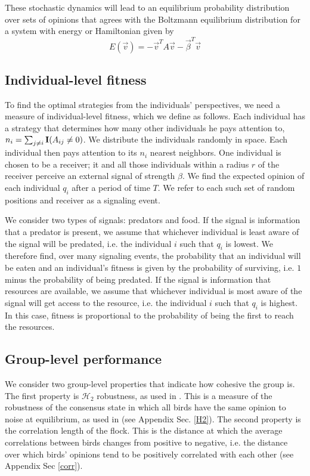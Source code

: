 \documentclass{article}
\begin{document}
These stochastic dynamics will lead to an equilibrium probability distribution over sets of opinions that agrees with the Boltzmann equilibrium distribution for a system with energy or Hamiltonian given by 
\begin{equation*}
E(\vec{v})=-\vec{v}^TA\vec{v}-\vec{\beta}^T\vec{v}
\end{equation*}  

\subsection{Individual-level fitness }
To find the optimal strategies from the individuals' perspectives, we need a measure of individual-level fitness, which we define as follows. Each individual has a strategy that determines how many other individuals he pays attention to, $n_i=\sum_{j\neq i}{\bf I}(A_{ij}\neq 0)$.  We distribute the individuals randomly in space.  Each individual then pays attention to its $n_i$ nearest neighbors.  One individual is chosen to be a receiver; it and all those individuals within a radius $r$ of the receiver perceive an external signal of strength $\beta$.  We find the expected opinion of each individual $q_i$ after a period of time $T$.  We refer to each such set of random positions and receiver as a signaling event. 

We consider two types of signals: predators and food.  If the signal is information that a predator is present, we assume that whichever individual is least aware of the signal will be predated, i.e. the individual $i$ such that $q_i$ is lowest.  We therefore find, over many signaling events, the probability that an individual will be eaten and an individual's fitness is given by the probability of surviving, i.e. $1$ minus the probability of being predated.  If the signal is information that resources are available, we assume that whichever individual is most aware of the signal will get access to the resource, i.e. the individual $i$ such that $q_i$ is highest. In this case, fitness is proportional to the probability of being the first to reach the resources. 

\subsection{Group-level performance }
We consider two group-level properties that indicate how cohesive the group is.  The first property is $\mathscr{H}_2$ robustness, as used in \cite{Young:2010fk,Young:2013kx}. This is a measure of the robustness of the consensus state in which all birds have the same opinion to noise at equilibrium, as used in (see Appendix Sec. \ref{H2}). The second property is the correlation length of the flock. This is the distance at which the average correlations between birds changes from positive to negative, i.e. the distance over which birds' opinions tend to be positively correlated with each other (see Appendix Sec \ref{corr}).
\end{document}
